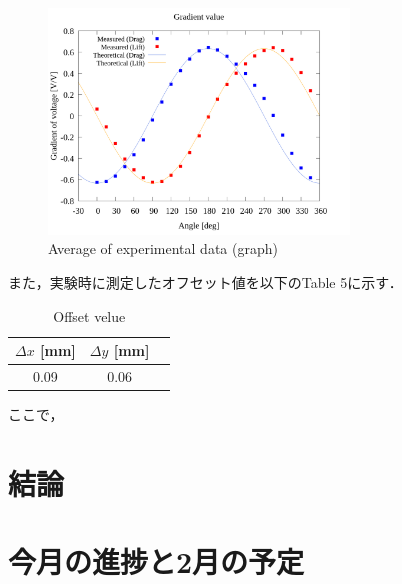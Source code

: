 \documentclass[twocolumn,a4j]{jsarticle}
\begin{document}
\begin{figure}[htbp]
    \begin{center}
        \includegraphics[width=80mm]{../../../02_workspace/result/2-ex/plot/20/20_adjust-value.png}
        \caption{Average of experimental data (graph)}
    \end{center}
\end{figure}

\newpage

また，実験時に測定したオフセット値を以下のTable 5に示す．

\begin{table}[htbp]
    \begin{center}
        \caption{Offset velue}
        \begin{tabular}{|p{30mm}|p{20mm}|p{20mm}|}
            \hline
            \multicolumn{1}{|c|}{$\Delta x$ [mm]} & \multicolumn{1}{|c|}{$\Delta y$ [mm]} \\ \hline
            \multicolumn{1}{|c|}{0.09}           & \multicolumn{1}{|c|}{0.06}           \\ \hline
        \end{tabular}
    \end{center}
\end{table}

ここで，

\section{結論}

\section{今月の進捗と2月の予定}
\end{document}
